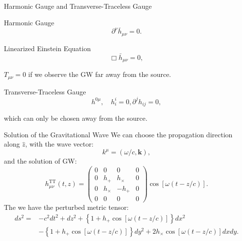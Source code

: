 \documentclass[xcolor=dvipsnames]{beamer}
\begin{document}
\begin{frame}[t]{Harmonic Gauge and Transverse-Traceless Gauge}
  \begin{block}{Harmonic Gauge}
    \begin{equation*}
      \partial^\nu \bar{h}_{\mu\nu} = 0.
    \end{equation*}
  \end{block}
  \begin{block}{Linearized Einstein Equation}
    \begin{equation*}
      \Box \bar{h}_{\mu\nu} = 0,
    \end{equation*}
  \end{block}
  $T_{\mu\nu} = 0$ if we observe the GW far away from the source.
  \begin{block}{Transverse-Traceless Gauge}
    \begin{equation*}
      h^{0\mu}, \quad h^i_i = 0, \partial^j h_{ij} = 0,
    \end{equation*}
  \end{block}
  which can only be chosen away from the source.
\end{frame}

\begin{frame}[t]{Solution of the Gravitational Wave}
  We can choose the propagation direction along $\hat{z}$, with the wave vector:
  \begin{equation*}
    k^\mu = (\omega/c, \mathbf{k}),
  \end{equation*}
  and the solution of GW:
  \begin{equation*}
    h^{\text{TT}}_{\mu\nu} (t, z) =
    \begin{pmatrix}
      0 & 0 & 0 & 0 \\
      0 & h_{+} & h_{\times} & 0 \\
      0 & h_{\times} & -h_{+} & 0 \\
      0 & 0 & 0 & 0
    \end{pmatrix}
    \cos \left[ \omega(t - z/c) \right].
  \end{equation*}
  The we have the perturbed metric tensor:
  \begin{align*}
    ds^2 = & -c^2 dt^2 + dz^2 + \left\{ 1 + h_{+}\cos[\omega(t - z/c)] \right\} dx^2 \\
    & - \left\{ 1 + h_{+}\cos[\omega(t - z/c)] \right\} dy^2 + 2h_{\times}\cos[\omega(t - z/c)] dxdy.
  \end{align*}
\end{frame}
\end{document}
